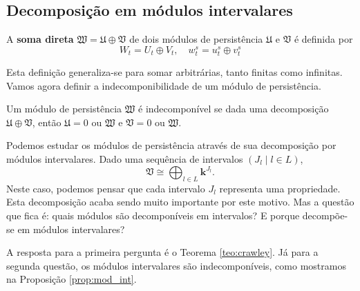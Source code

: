 \subsection{Decomposição em módulos intervalares} 

\begin{defi}
    A \textbf{soma direta} $\mathfrak{W} = \mathfrak{U} \oplus \mathfrak{V}$ de dois módulos
    de persistência $\mathfrak{U}$ e $\mathfrak{V}$ é definida por
    \begin{equation*}
        W_t = U_t \oplus V_t, \quad w^s_t = u_t^s \oplus v^s_t
    \end{equation*}
\end{defi}
Esta definição generaliza-se para somar arbitrárias, tanto finitas como infinitas. Vamos agora definir
a indecomponibilidade de um módulo de persistência.

\begin{defi}
    Um módulo de persistência $\mathfrak{W}$ é indecomponível se dada uma decomposição $\mathfrak{U}
    \oplus \mathfrak{V}$, então $\mathfrak{U} = 0$ ou $\mathfrak{W}$ e $\mathfrak{V} = 0$ ou $
        \mathfrak{W}$.
\end{defi}

Podemos estudar os módulos de persistência através de sua decomposição por módulos intervalares. Dado
uma sequência de intervalos $(J_l \mid l \in L)$,
\begin{equation*}
    \mathfrak{V} \cong \bigoplus_{l \in L} \mathbf{k}^{J_l}.
\end{equation*}
Neste caso, podemos pensar que cada intervalo $J_l$ representa uma propriedade. Esta decomposição acaba
sendo muito importante por este motivo. Mas a questão que fica é: quais módulos são decomponíveis em 
intervalos? E porque decompõe-se em módulos intervalares? 

A resposta para a primeira pergunta é o Teorema \ref{teo:crawley}. Já para a segunda questão,
os módulos intervalares são indecomponíveis, como mostramos na Proposição \ref{prop:mod_int}.

